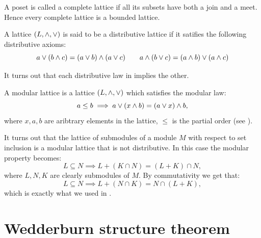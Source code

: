 \documentclass[11pt,a4paper]{article}
\begin{document}
\begin{remark}
  A poset is called a complete lattice if all its subsets have both a join and a meet.
  Hence every complete lattice is a bounded lattice.
\end{remark}

\begin{definition}
  \label{def:distributive-lattice}
  A lattice $(L,\wedge,\vee)$ is said to be a distributive lattice
  if it satifies the following distributive axioms:
  \[
    a \vee (b \wedge c) = (a \vee b) \wedge (a \vee c) \qquad
    a \wedge (b \vee c) = (a \wedge b) \vee (a \wedge c)
  \]
\end{definition}

\begin{remark}
  It turns out that each distributive law in 
  implies the other.
\end{remark}

\begin{definition}
  A modular lattice is a lattice $(L,\wedge,\vee)$ which satisfies the
  modular law:
  \[
    a \le b \implies a \vee (x \wedge b) = (a \vee x) \wedge b,
  \]
  where $x,a,b$ are aribtrary elements in the lattice, $\le$
  is the partial order (see ).
\end{definition}

\begin{remark}
  It turns out that the lattice of submodules of a module $M$ with respect
  to set inclusion is a modular lattice that is not distributive.
  In this case the modular property becomes:
  \[
    L \subseteq N \implies
    L + (K \cap N) = (L + K) \cap N,
  \]
  where $L,N,K$ are clearly submodules of $M$.
  By commutativity we get that:
  \[
    L \subseteq N \implies
    L + (N \cap K) = N \cap (L + K),
  \]
  which is exactly what we used in .
\end{remark}

\newpage

\section{Wedderburn structure theorem}
\end{document}
